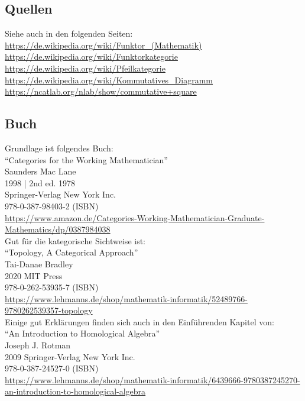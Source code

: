 \documentclass[a4paper]{amsart}
\theoremstyle{definition}
\begin{document}
\subsection*{Quellen}
Siehe auch in den folgenden Seiten:\\
\url{https://de.wikipedia.org/wiki/Funktor_(Mathematik)}\\
\url{https://de.wikipedia.org/wiki/Funktorkategorie}\\
\url{https://de.wikipedia.org/wiki/Pfeilkategorie}\\
\url{https://de.wikipedia.org/wiki/Kommutatives_Diagramm}\\
\url{https://ncatlab.org/nlab/show/commutative+square}

\subsection*{Buch}
Grundlage ist folgendes Buch:\\
"`Categories for the Working Mathematician"'\\
Saunders Mac Lane\\
1998 | 2nd ed. 1978\\
Springer-Verlag New York Inc.\\
978-0-387-98403-2 (ISBN)\\
{\tiny
   \url{https://www.amazon.de/Categories-Working-Mathematician-Graduate-Mathematics/dp/0387984038}}\\

Gut für die kategorische Sichtweise ist:\\
"`Topology, A Categorical Approach"'\\
Tai-Danae Bradley\\
2020 MIT Press\\
978-0-262-53935-7 (ISBN)\\
{\tiny
\url{https://www.lehmanns.de/shop/mathematik-informatik/52489766-9780262539357-topology}}\\

Einige gut Erklärungen finden sich auch in den Einführenden Kapitel von:\\
"`An Introduction to Homological Algebra"'\\
Joseph J. Rotman\\
2009 Springer-Verlag New York Inc.\\
978-0-387-24527-0 (ISBN)\\
{\tiny \url{https://www.lehmanns.de/shop/mathematik-informatik/6439666-9780387245270-an-introduction-to-homological-algebra}}\\
\end{document}
